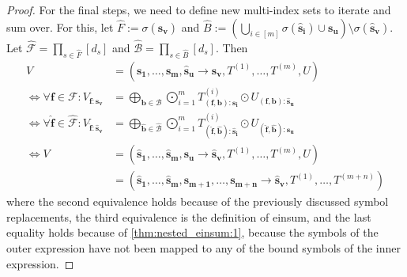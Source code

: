 \begin{proof}
    For the final steps, we need to define new multi-index sets to iterate and sum over.
    For this, let $\hat{F} := \sigma(\bm{\hat{s}_v})$ and $\hat{B} := \left(\bigcup_{i \in [m]} \sigma(\bm{\hat{s}_i}) \cup \bm{s_u}\right) \setminus \sigma(\bm{\hat{s}_v})$.
    Let $\mathcal{\hat{F}} = \prod_{s \in \hat{F}} [d_s]$ and $\mathcal{\hat{B}} = \prod_{s \in \hat{B}} [d_s]$.
    Then
    \begin{align*}
        V                                                                                 & = (\bm{s_1},\dots,\bm{s_m}, \bm{\hat{s}_u} \rightarrow \bm{s_v}, T^{(1)},\dots,T^{(m)}, U)                                                                                                \\
        \iff \forall \bm{f} \in \mathcal{F}: V_{\bm{f}: \bm{s_v}}                         & = \bigoplus\limits_{\bm{b} \in \mathcal{B}} \bigodot\limits_{i = 1}^{m} T^{(i)}_{(\bm{f}, \bm{b}):\bm{s_i}} \odot U_{(\bm{f}, \bm{b}):\bm{\hat{s}_u}}                                     \\
        \iff \forall \bm{\hat{f}} \in \mathcal{\hat{F}}: V_{\bm{\hat{f}}: \bm{\hat{s}_v}} & = \bigoplus\limits_{\bm{\hat{b}} \in \mathcal{\hat{B}}} \bigodot\limits_{i = 1}^{m} T^{(i)}_{(\bm{\hat{f}}, \bm{\hat{b}}):\bm{\hat{s}_i}} \odot U_{(\bm{\hat{f}}, \bm{\hat{b}}):\bm{s_u}} \\
        \iff V                                                                            & = (\bm{\hat{s}_1},\dots,\bm{\hat{s}_m}, \bm{s_u} \rightarrow \bm{\hat{s}_v}, T^{(1)},\dots,T^{(m)}, U)                                                                                    \\
                                                                                          & = (\bm{\hat{s}_1}, \dots, \bm{\hat{s}_m}, \bm{s_{m + 1}}, \dots, \bm{s_{m + n}} \rightarrow \bm{\hat{s}_v}, T^{(1)}, \dots, T^{(m + n)})
    \end{align*}
    where the second equivalence holds because of the previously discussed symbol replacements, the third equivalence is the definition of einsum, and the last equality holds because of \autoref{thm:nested_einsum:1}, because the symbols of the outer expression have not been mapped to any of the bound symbols of the inner expression.
\end{proof}
\bigskip